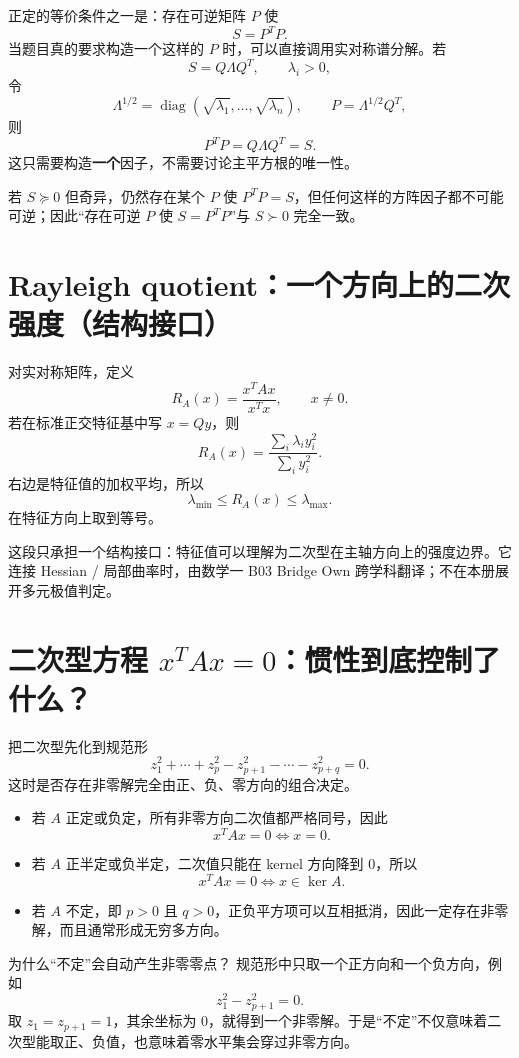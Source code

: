 \documentclass[11pt,a4paper]{ctexart}
\newcommand{\kw}[1]{\textbf{\color{deep}#1}}
\begin{document}
正定的等价条件之一是：存在可逆矩阵 $P$ 使
\[
S=P^TP.
\]
当题目真的要求构造一个这样的 $P$ 时，可以直接调用实对称谱分解。若
\[
S=Q\Lambda Q^T,
\qquad \lambda_i>0,
\]
令
\[
\Lambda^{1/2}=\operatorname{diag}(\sqrt{\lambda_1},\dots,\sqrt{\lambda_n}),
\qquad
\boxed{P=\Lambda^{1/2}Q^T},
\]
则
\[
P^TP
=Q\Lambda Q^T
=S.
\]
这只需要构造\kw{一个}因子，不需要讨论主平方根的唯一性。

若 $S\succeq0$ 但奇异，仍然存在某个 $P$ 使 $P^TP=S$，但任何这样的方阵因子都不可能可逆；因此“存在可逆 $P$ 使 $S=P^TP$”与 $S\succ0$ 完全一致。

\section{Rayleigh quotient：一个方向上的二次强度（结构接口）}

对实对称矩阵，定义
\[
R_A(x)=\frac{x^TAx}{x^Tx},
\qquad x\neq0.
\]
若在标准正交特征基中写 $x=Qy$，则
\[
R_A(x)=
\frac{\sum_i\lambda_i y_i^2}{\sum_i y_i^2}.
\]
右边是特征值的加权平均，所以
\[
\boxed{
\lambda_{\min}\le R_A(x)\le\lambda_{\max}.
}
\]
在特征方向上取到等号。

这段只承担一个结构接口：特征值可以理解为二次型在主轴方向上的强度边界。它连接 Hessian / 局部曲率时，由数学一 B03 Bridge Own 跨学科翻译；不在本册展开多元极值判定。

\section{二次型方程 $x^TAx=0$：惯性到底控制了什么？}

把二次型先化到规范形
\[
z_1^2+\cdots+z_p^2
-z_{p+1}^2-\cdots-z_{p+q}^2=0.
\]
这时是否存在非零解完全由正、负、零方向的组合决定。

\begin{itemize}
  \item 若 $A$ 正定或负定，所有非零方向二次值都严格同号，因此
  \[
  x^TAx=0\iff x=0.
  \]
  \item 若 $A$ 正半定或负半定，二次值只能在 kernel 方向降到 $0$，所以
  \[
  \boxed{x^TAx=0\iff x\in\ker A.}
  \]
  \item 若 $A$ 不定，即 $p>0$ 且 $q>0$，正负平方项可以互相抵消，因此一定存在非零解，而且通常形成无穷多方向。
\end{itemize}

\begin{examplebox}{为什么“不定”会自动产生非零零点？}
规范形中只取一个正方向和一个负方向，例如
\[
z_1^2-z_{p+1}^2=0.
\]
取 $z_1=z_{p+1}=1$，其余坐标为 $0$，就得到一个非零解。于是“不定”不仅意味着二次型能取正、负值，也意味着零水平集会穿过非零方向。
\end{examplebox}
\end{document}
